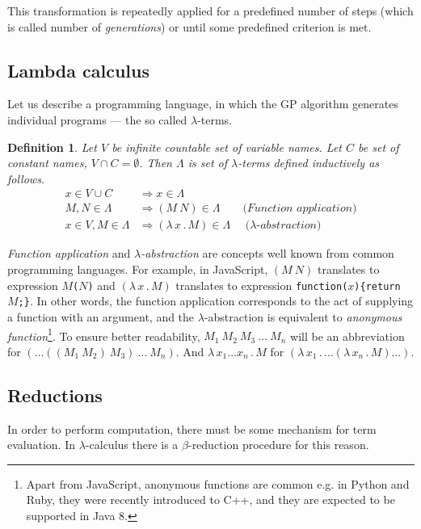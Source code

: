 \documentclass[11pt]{article}
\newtheorem{definition}{Definition}
\newcommand{\Lets}{Let us\xspace}
\newcommand{\lterms}{$\lambda$-terms\xspace}
\newcommand{\then}{\Rightarrow\xspace}
\newcommand{\lamb}[2]{( \lambda \, #1 \, . \, #2 )}
\newcommand{\lam}[2]{\lambda \, #1 \, . \, #2}
\begin{document}
\begin{article}
This transformation is repeatedly applied for a predefined number of steps (which is called number of \textit{generations}) or until some predefined criterion is met.

\subsection{Lambda calculus}

\Lets describe a programming language, 
in which the GP algorithm generates individual programs --- the so called \lterms.

\begin{definition}
Let $V$ be infinite countable set of {\it 
variable names}. Let $C$ be set of {\it constant names}, 
$V \cap C = \emptyset$.	 	
Then $\Lambda$ is set of {\it \lterms} defined inductively as follows.	
\begin{align*}
x   \in V \cup C  &\then x     \in \Lambda \\
M,N \in \Lambda   &\then (M~N) \in \Lambda 
\textit{~~~~~~(Function application)} \\
x   \in V , M \in \Lambda &\then \lamb{x}{M} \in \Lambda
\textit{~~~~($\lambda$-abstraction)} 
\end{align*}
\end{definition}

\textit{Function application} and 
\textit{$\lambda$-abstraction} are concepts
well known from common programming languages. 
For example, in JavaScript, 
$(M~N)$ translates to expression \texttt{$M$($N$)} and
$\lamb{x}{M}$ translates to expression \texttt{function($x$)\{return $M$;\}}.
In other words, the function application 
corresponds to the act of supplying a function 
with an argument, and
the $\lambda$-abstraction is equivalent to 
\textit{anonymous function}\footnote{Apart from JavaScript, anonymous functions are common e.g. in Python and Ruby, 
they were recently introduced to C++, and they are expected to be supported in Java 8.}.
To ensure better readability, 
$M_1~M_2~M_3~\dots~M_n$ will be an abbreviation for 
$(\dots((M_1~M_2)~M_3)~\dots~M_n)$.
And $\lam{x_1 \dots x_n }{M}$  for
$\lamb{x_1}{\dots\lamb{x_n}{M}\dots}$.

\subsection{Reductions}

In order to perform computation, there must be some
mechanism for term evaluation. In $\lambda$-calculus there
is a \mbox{$\beta$-reduction} procedure for this reason.


\end{article}
\end{document}
